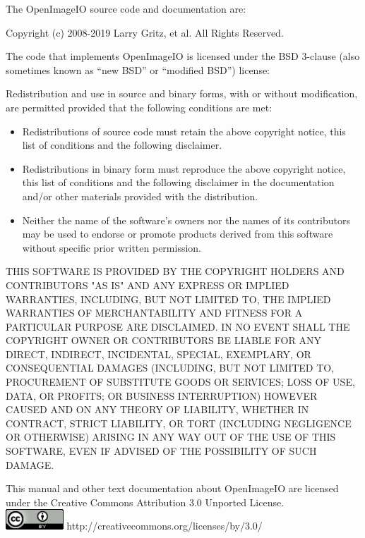 \newpage
\label{speccopyr}

\vspace*{0.2in}

\noindent The OpenImageIO source code and
documentation are:

\vspace*{0.2in}

\noindent Copyright (c) 2008-2019 Larry Gritz, et al.
All Rights Reserved.

\vspace{0.5in}

The code that implements OpenImageIO is licensed under
the BSD 3-clause (also sometimes known as ``new BSD'' or
``modified BSD'') license:

\vspace{0.25in}

Redistribution and use in source and binary forms, with or without
modification, are permitted provided that the following conditions are
met:

\begin{itemize}
\item Redistributions of source code must retain the above copyright
  notice, this list of conditions and the following disclaimer.
\item Redistributions in binary form must reproduce the above copyright
  notice, this list of conditions and the following disclaimer in the
  documentation and/or other materials provided with the distribution.
\item Neither the name of the software's owners nor the names of its
  contributors may be used to endorse or promote products derived from
  this software without specific prior written permission.
\end{itemize}

THIS SOFTWARE IS PROVIDED BY THE COPYRIGHT HOLDERS AND CONTRIBUTORS
"AS IS" AND ANY EXPRESS OR IMPLIED WARRANTIES, INCLUDING, BUT NOT
LIMITED TO, THE IMPLIED WARRANTIES OF MERCHANTABILITY AND FITNESS FOR
A PARTICULAR PURPOSE ARE DISCLAIMED. IN NO EVENT SHALL THE COPYRIGHT
OWNER OR CONTRIBUTORS BE LIABLE FOR ANY DIRECT, INDIRECT, INCIDENTAL,
SPECIAL, EXEMPLARY, OR CONSEQUENTIAL DAMAGES (INCLUDING, BUT NOT
LIMITED TO, PROCUREMENT OF SUBSTITUTE GOODS OR SERVICES; LOSS OF USE,
DATA, OR PROFITS; OR BUSINESS INTERRUPTION) HOWEVER CAUSED AND ON ANY
THEORY OF LIABILITY, WHETHER IN CONTRACT, STRICT LIABILITY, OR TORT
(INCLUDING NEGLIGENCE OR OTHERWISE) ARISING IN ANY WAY OUT OF THE USE
OF THIS SOFTWARE, EVEN IF ADVISED OF THE POSSIBILITY OF SUCH DAMAGE.


\vspace{0.5in}

This manual and other text documentation about OpenImageIO
are licensed under the Creative Commons Attribution 3.0
Unported License. \\

\smallskip
\spc \includegraphics[width=0.85in]{figures/CC-30BY.png} 
\spc http://creativecommons.org/licenses/by/3.0/
 \bigskip 

